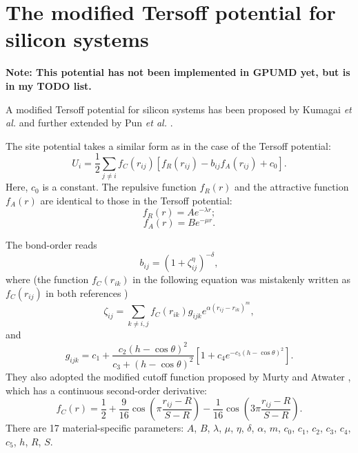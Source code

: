 \documentclass[12pt,a4paper]{report}
\begin{document}
\section{The modified Tersoff potential for silicon systems}

\textbf{Note: This potential has not been implemented in GPUMD yet, but is in my TODO list.}

A modified Tersoff potential for silicon systems has been proposed by Kumagai \textit{et al.} \cite{kumagai2007cms} and further extended by Pun \textit{et al.} \cite{pun2017prb}.

The site potential takes a similar form as in the case of the Tersoff potential:
\begin{equation}
U_i =  \frac{1}{2} \sum_{j \neq i} f_C(r_{ij}) \left[ f_R(r_{ij}) - b_{ij} f_A(r_{ij}) + c_0\right].
\end{equation}
Here, $c_0$ is a constant. The repulsive function $f_{R}(r)$ and the attractive function $f_{A}(r)$ are identical to those in the Tersoff potential:
\begin{equation}
f_{R}(r) = A e^{-\lambda r};
\end{equation}
\begin{equation}
f_{A}(r) = B e^{-\mu r}.
\end{equation}

The bond-order reads
\begin{equation}
b_{ij} = \left(1 + \zeta_{ij}^{\eta}\right)^{-\delta},
\end{equation}
where (the function $f_C(r_{ik})$ in the following equation was mistakenly written as $f_C(r_{ij})$ in both references \cite{kumagai2007cms,pun2017prb})
\begin{equation}
\zeta_{ij} = \sum_{k\neq i, j}f_C(r_{ik}) g_{ijk} e^{\alpha (r_{ij} - r_{ik})^m},
\end{equation}
and
\begin{equation}
g_{ijk} = c_1 + \frac{c_2(h-\cos\theta)^2}{c_3+(h-\cos\theta)^2}
                \left[1+c_4e^{-c_5(h-\cos\theta)^2}\right].
\end{equation}
They also adopted the modified cutoff function proposed by
Murty and Atwater \cite{murty1995prb}, which has a continuous second-order derivative:
\begin{equation}
f_{C}(r) = \frac{1}{2} +
\frac{9}{16} \cos \left( \pi \frac{r_{ij} - R}{S - R} \right) -
\frac{1}{16} \cos \left( 3\pi \frac{r_{ij} - R}{S - R} \right).
\end{equation}
There are 17 material-specific parameters: $A$, $B$, $\lambda$, $\mu$, $\eta$, $\delta$, $\alpha$, $m$, $c_0$, $c_1$, $c_2$, $c_3$, $c_4$, $c_5$, $h$, $R$, $S$.
\end{document}
